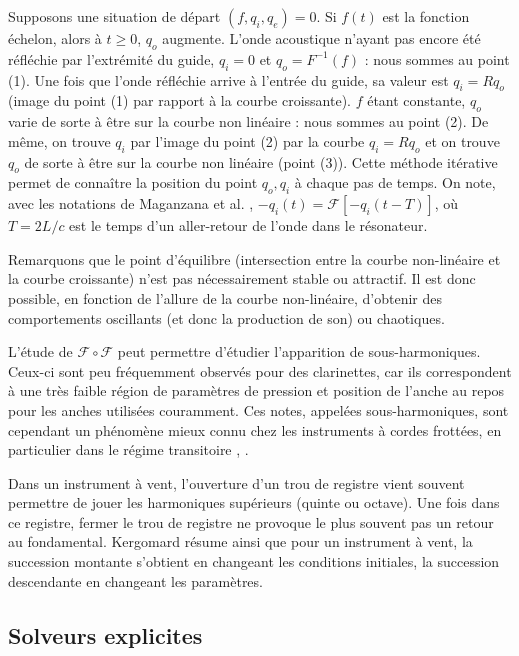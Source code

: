 \documentclass[atiam, article]{rapport} %
\begin{document}
Supposons une situation de départ $(f,q_i,q_e) = 0$. Si $f(t)$ est la fonction échelon, alors à $t\geq 0$, $q_o$ augmente. L'onde acoustique n'ayant pas encore été réfléchie par l'extrémité du guide, $q_i=0$ et $q_o=F^{-1}(f)$ : nous sommes au point (1). Une fois que l'onde réfléchie arrive à l'entrée du guide, sa valeur est $q_i=Rq_o$ (image du point (1) par rapport à la courbe croissante). $f$ étant constante, $q_o$ varie de sorte à être sur la courbe non linéaire : nous sommes au point (2). De même, on trouve $q_i$ par l'image du point (2) par la courbe $q_i=Rq_o$ et on trouve $q_o$ de sorte à être sur la courbe non linéaire (point (3)). Cette méthode itérative permet de connaître la position du point $q_o,q_i$ à chaque pas de temps. On note, avec les notations de Maganzana et al. \cite{maganza_bifurcations_1986}, $-q_i(t) = \mathcal{F}[-q_i(t-T)]$, où $T=2L/c$ est le temps d'un aller-retour de l'onde dans le résonateur.

Remarquons que le point d'équilibre (intersection entre la courbe non-linéaire et la courbe croissante) n'est pas nécessairement stable ou attractif. Il est donc possible, en fonction de l'allure de la courbe non-linéaire, d'obtenir des comportements oscillants (et donc la production de son) ou chaotiques.

L'étude de $\mathcal{F} \circ \mathcal{F}$ peut permettre d'étudier l'apparition de sous-harmoniques. Ceux-ci sont peu fréquemment observés pour des clarinettes, car ils correspondent à une très faible région de paramètres de pression et position de l'anche au repos pour les anches utilisées couramment. Ces notes, appelées sous-harmoniques, sont cependant un phénomène mieux connu chez les instruments à cordes frottées, en particulier dans le régime transitoire \cite{kergomard_instruments_1997}, \cite{mcintyre_oscillations_1983}.

Dans un instrument à vent, l'ouverture d'un trou de registre vient souvent permettre de jouer les harmoniques supérieurs (quinte ou octave). Une fois dans ce registre, fermer le trou de registre ne provoque le plus souvent pas un retour au fondamental.
Kergomard résume ainsi que pour un instrument à vent, \og la succession montante s’obtient en changeant les conditions initiales, la succession descendante en changeant les paramètres\fg \cite{kergomard_instruments_1997}.

\subsection{Solveurs explicites} \label{sec:solveurs}
\end{document}
